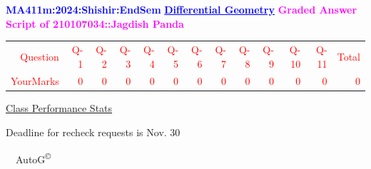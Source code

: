 \documentclass{article}                              %
\begin{document}
%
\vspace*{1in}

\begin{center}
	\textbf{\textcolor{blue}{\LARGE MA411m:2024:Shishir:EndSem}}
	\vskip 1cm
	\textbf{\textcolor{blue}{\underline{\Large Differential Geometry}}}
	\vskip 1cm
	\textbf{\textcolor{magenta}{\LARGE Graded Answer Script of 210107034::Jagdish Panda}}
\end{center}


\begin{center}
	\Huge 
	\textcolor{red}{
	\begin{tabular}{*{13}{r}}
		Question&Q-1& Q-2& Q-3& Q-4& Q-5& Q-6& Q-7& Q-8& Q-9& Q-10& Q-11&Total  \\
        	YourMarks&0&0&0&0&0&0&0&0&0&0&0&0
	\end{tabular}
	}
        \vskip 2cm
	\large
	\underline{Class Performance Stats}
	\DTLsetseparator{;}
	\begin{table}[htbp]
		\centering
	\end{table}
	\vskip 1cm
	Deadline for recheck requests is Nov. 30
\end{center}
\ \vfill \ \hfill \small AutoG\textsuperscript{\copyright}
\newpage
%
\end{document}
